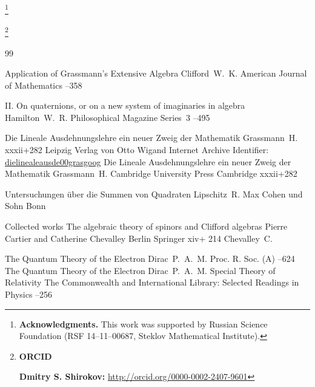 \RuDate


\smallskip

\makeentitle



\thanks{\textbf{Acknowledgments.} 
This work was supported by Russian Science Foundation (RSF 14--11--00687, Steklov Mathematical Institute).
}

\thanks{{\bf ORCID}

{\bf Dmitry S. Shirokov:} \url{http://orcid.org/0000-0002-2407-9601}


}


\EngRef

\begin{thebibliography}{99}

\paper Application of Grassmann's Extensive Algebra
\by    Clifford~W.~K.
\jour American Journal of Mathematics
--358

\paper II. On quaternions, or on a new system of imaginaries in algebra
\by    Hamilton~W.~R.
\jour Philosophical Magazine Series~3
–495

\book  Die Lineale Ausdehnungslehre ein neuer Zweig der Mathematik 
\by    Grassmann~H.
\totalpages xxxii+282
\publaddr Leipzig
\publ Verlag von Otto Wigand
\elink  Internet Archive Identifier: \href{https://archive.org/details/dielinealeausde00grasgoog}{dielinealeausde00grasgoog} 
\moreref
\book  Die Lineale Ausdehnungslehre ein neuer Zweig der Mathematik 
\by    Grassmann~H.
\publ  Cambridge University Press
\publaddr Cambridge
\totalpages xxxii+282



\book Untersuchungen \"uber die Summen von Quadraten
\by    Lipschitz~R.
\publ Max Cohen und Sohn
\publaddr Bonn

\book Collected works
\volinfo The algebraic theory of spinors and Clifford algebras
\eds Pierre Cartier and Catherine Chevalley 
\publaddr Berlin
\publ Springer
\totalpages xiv+ 214 
\by    Chevalley~C.


\paper The Quantum Theory of the Electron
\by    Dirac~P.~A.~M.
\jour Proc. R. Soc. (A)
--624
\moreref
{}
\paper The Quantum Theory of the Electron
\by    Dirac~P.~A.~M.
\inbook Special Theory of Relativity
\serial The Commonwealth and International Library: Selected Readings in Physics
–256



\end{thebibliography}
